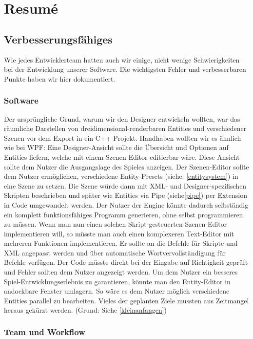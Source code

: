 \chapter{Resumé}

\section{Verbesserungsfähiges}
 Wie jedes Entwicklerteam hatten auch wir einige, nicht wenige Schwierigkeiten bei der Entwicklung unserer Software. Die wichtigsten Fehler und verbesserbaren Punkte haben wir hier dokumentiert.

\subsection{Software}
Der ursprüngliche Grund, warum wir den Designer entwickeln wollten, war das räumliche Darstellen von dreidimensional-renderbaren Entities und verschiedener Szenen vor dem Export in ein C++ Projekt. Handhaben wollten wir es ähnlich wie bei WPF: Eine Designer-Ansicht sollte die Übersicht und Optionen auf Entities liefern, welche mit einem Szenen-Editor editierbar wäre. Diese Ansicht sollte dem Nutzer die Ausgangslage des Spieles anzeigen.
Der Szenen-Editor sollte dem Nutzer ermöglichen, verschiedene Entity-Presets (siehe: \cref{entitysystem}) in eine Szene zu setzen. Die Szene würde dann mit XML- und Designer-spezifischen Skripten beschrieben und später wie Entities via Pipe (siehe\cref{pipe}) per Extension in Code umgewandelt werden.
Der Nutzer der Engine könnte dadurch selbständig ein komplett funktionsfähiges Programm generieren, ohne selbst programmieren zu müssen.
Wenn man nun einen solchen Skript-gesteuerten Szenen-Editor implementieren will, so müsste man auch einen komplexeren Text-Editor mit mehreren Funktionen implementieren. Er sollte an die Befehle für Skripte und XML angepasst werden und über automatische Wortvervollständigung für Befehle verfügen. Der Code müsste direkt bei der Eingabe auf Richtigkeit geprüft und Fehler sollten dem Nutzer angezeigt werden.
Um dem Nutzer ein besseres Spiel-Entwicklungserlebnis zu garantieren, könnte man den Entity-Editor in andockbare Fenster umlagern. So wäre es dem Nutzer möglich verschiedene Entities parallel zu bearbeiten.
Vieles der geplanten Ziele mussten aus Zeitmangel heraus gekürzt werden. (Grund: Siehe \cref{kleinanfangen})

\subsection{Team und Workflow}
